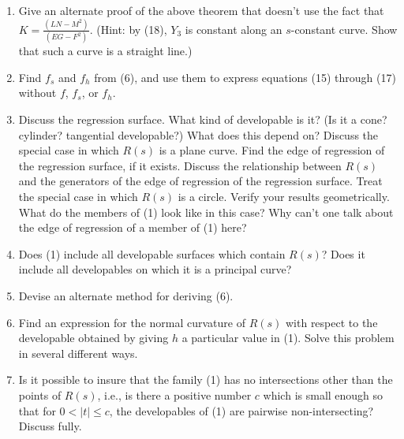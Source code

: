 \documentclass{book}
\begin{document}
\begin{enumerate}[1.]
     To see that $M = Y_{3} \cdot Y_{12} = 0$, note that $Y_{12}$ is a linear combination of $Z$ and $Z_{h}$, each of which is orthogonal to $Y_{3}$ by (18). Similarly, $N = Y_{3} \cdot Y_{22} = 0$, since $Y_{22}$ is a linear combination of $Z$ and $Z_{h}$ (note Problem 3). It follows that (14), henceforth called the \emph{regression surface} of (1), is a developable surface! We then have the following theorem.

     \textbf{Theorem}: The union of the edges of regression of the family (1) is a developable surface.
  \item Give an alternate proof of the above theorem that doesn't use the fact that $K = \frac{ (LN - M^{2}) }{ (EG - F^{2}) }$. (Hint: by (18), $Y_{3}$ is constant along an $s$-constant curve. Show that such a curve is a straight line.)
  \item Find $f_{s}$ and $f_{h}$ from (6), and use them to express equations (15) through (17) without $f$, $f_{s}$, or $f_{h}$.
  \item Discuss the regression surface. What kind of developable is it? (Is it a cone? cylinder? tangential developable?) What does this depend on? Discuss the special case in which $R(s)$ is a plane curve. Find the edge of regression of the regression surface, if it exists. Discuss the relationship between $R(s)$ and the generators of the edge of regression of the regression surface. Treat the special case in which $R(s)$ is a circle. Verify your results geometrically. What do the members of (1) look like in this case? Why can't one talk about the edge of regression of a member of (1) here?
  \item Does (1) include all developable surfaces which contain $R(s)$? Does it include all developables on which it is a principal curve?
  \item Devise an alternate method for deriving (6).
  \item Find an expression for the normal curvature of $R(s)$ with respect to the developable obtained by giving $h$ a particular value in (1). Solve this problem in several different ways.
  \item Is it possible to insure that the family (1) has no intersections other than the points of $R(s)$, i.e., is there a positive number $c$ which is small enough so that for $0 <  \vert t \vert  \leq c$, the developables of (1) are pairwise non-intersecting? Discuss fully.
\end{enumerate}
\end{document}
